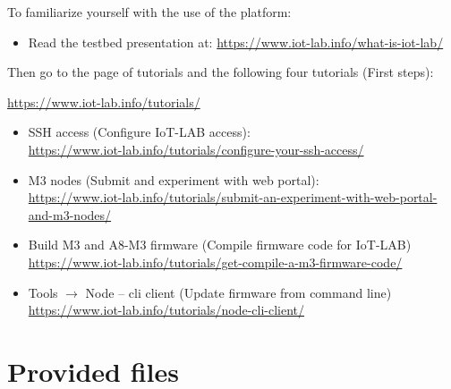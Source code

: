 \documentclass{article}
\begin{document}
To familiarize yourself with the use of the platform:
\begin{itemize}
\item Read the testbed presentation at: \url{https://www.iot-lab.info/what-is-iot-lab/}
\end{itemize}


Then go to the page of tutorials and the following four tutorials (First steps):
\begin{center} \url{https://www.iot-lab.info/tutorials/} \end{center}
\begin{itemize}
   \item SSH access (Configure IoT-LAB access): \\
   \url{https://www.iot-lab.info/tutorials/configure-your-ssh-access/}
   \item M3 nodes (Submit and experiment with web portal): \\
   \url{https://www.iot-lab.info/tutorials/submit-an-experiment-with-web-portal-and-m3-nodes/}
   \item Build M3 and A8-M3 firmware (Compile firmware code for IoT-LAB)\\
   \url{https://www.iot-lab.info/tutorials/get-compile-a-m3-firmware-code/}
   \item Tools $\to$ Node -- cli client (Update firmware from command line) \\
   \url{https://www.iot-lab.info/tutorials/node-cli-client/}
\end{itemize}



\section{Provided files}
\end{document}
